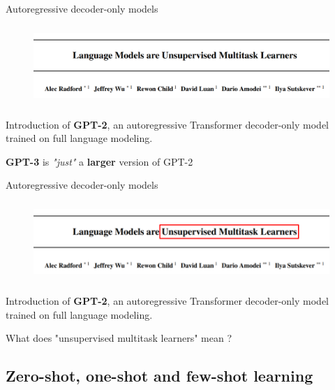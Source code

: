 \documentclass[12pt,aspectratio=169,handout]{beamer}
\begin{document}
\begin{frame}{Autoregressive decoder-only models}
	\begin{figure}[h]
		\includegraphics[height=3cm]{gpt2-paper}
	\end{figure}

	Introduction of \textbf{GPT-2}, an autoregressive Transformer decoder-only model trained on full language modeling.

	\pause

	\textbf{GPT-3} is \textit{"just"} a \textbf{larger} version of GPT-2 

\end{frame}

\begin{frame}{Autoregressive decoder-only models}
	\begin{figure}[h]
		\includegraphics[height=3cm]{gpt2-title-anno}
	\end{figure}

	Introduction of \textbf{GPT-2}, an autoregressive Transformer decoder-only model trained on full language modeling.

	\hspace{1em} What does "unsupervised multitask learners" mean ?
\end{frame}

\subsection{Zero-shot, one-shot and few-shot learning}
\end{document}
